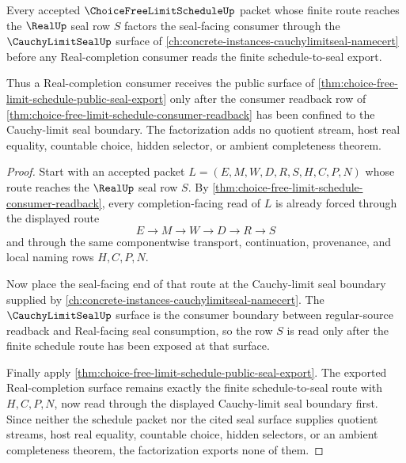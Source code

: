 \begin{theorem}
\label{thm:choice-free-limit-schedule-cauchy-limit-seal-factorization}
Every accepted $\ChoiceFreeLimitScheduleUp$ packet whose finite route reaches the $\RealUp$ seal row $S$ factors the seal-facing consumer through the $\CauchyLimitSealUp$ surface of \autoref{ch:concrete-instances-cauchylimitseal-namecert} before any Real-completion consumer reads the finite schedule-to-seal export.

Thus a Real-completion consumer receives the public surface of \autoref{thm:choice-free-limit-schedule-public-seal-export} only after the consumer readback row of \autoref{thm:choice-free-limit-schedule-consumer-readback} has been confined to the Cauchy-limit seal boundary. The factorization adds no quotient stream, host real equality, countable choice, hidden selector, or ambient completeness theorem.
\end{theorem}
\begin{proof}
Start with an accepted packet $L=(E,M,W,D,R,S,H,C,P,N)$ whose route reaches the $\RealUp$ seal row $S$. By \autoref{thm:choice-free-limit-schedule-consumer-readback}, every completion-facing read of $L$ is already forced through the displayed route
$$
E \to M \to W \to D \to R \to S
$$
and through the same componentwise transport, continuation, provenance, and local naming rows $H,C,P,N$.

Now place the seal-facing end of that route at the Cauchy-limit seal boundary supplied by \autoref{ch:concrete-instances-cauchylimitseal-namecert}. The $\CauchyLimitSealUp$ surface is the consumer boundary between regular-source readback and Real-facing seal consumption, so the row $S$ is read only after the finite schedule route has been exposed at that surface.

Finally apply \autoref{thm:choice-free-limit-schedule-public-seal-export}. The exported Real-completion surface remains exactly the finite schedule-to-seal route with $H,C,P,N$, now read through the displayed Cauchy-limit seal boundary first. Since neither the schedule packet nor the cited seal surface supplies quotient streams, host real equality, countable choice, hidden selectors, or an ambient completeness theorem, the factorization exports none of them.
\end{proof}

